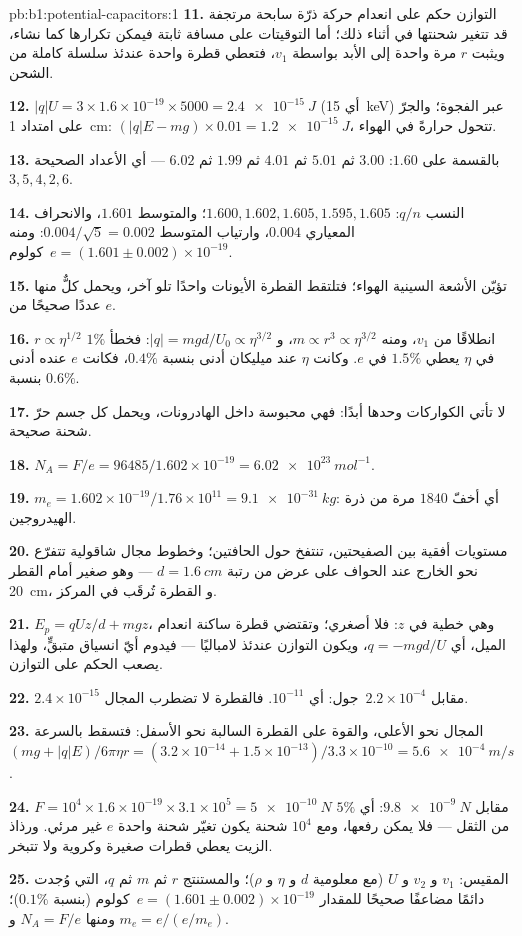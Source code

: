\begin{solution}{pb:b1:potential-capacitors:1}
\textbf{11.} التوازن حكم على انعدام حركة ذرّة سابحة مرتجفة
قد تتغير شحنتها في أثناء ذلك؛ أما التوقيتات على مسافة ثابتة فيمكن
تكرارها كما نشاء، ويثبت $r$ مرة واحدة إلى الأبد بواسطة $v_1$، فتعطي قطرة واحدة
عندئذ سلسلة كاملة من الشحن.

\textbf{12.} $|q|U = 3 \times 1.6 \times 10^{-19} \times 5000 = \qty{2.4e-15}{J}$
(أي \qty{15}{keV}) عبر الفجوة؛ والجرّ على امتداد \qty{1}{cm}: $(|q|E - mg) \times 0.01 =
\qty{1.2e-15}{J}$، تتحول حرارةً في الهواء.

\textbf{13.} بالقسمة على $1.60$: $3.00$ ثم $5.01$ ثم $4.01$ ثم $1.99$ ثم $6.02$ ---
أي الأعداد الصحيحة $3, 5, 4, 2, 6$.

\textbf{14.} النسب $q/n$: $1.600, 1.602, 1.605, 1.595, 1.605$؛ والمتوسط $1.601$،
والانحراف المعياري $0.004$، وارتياب المتوسط $0.004/\sqrt5 =
0.002$: ومنه $e = (1.601 \pm 0.002) \times 10^{-19}$~كولوم.

\textbf{15.} تؤيّن الأشعة السينية الهواء؛ فتلتقط القطرة الأيونات واحدًا
تلو آخر، ويحمل كلٌّ منها عددًا صحيحًا من $e$.

\textbf{16.} $r \propto \eta^{1/2}$ انطلاقًا من $v_1$، ومنه $m \propto r^3 \propto \eta^{3/2}$، و
$|q| = mgd/U_0 \propto \eta^{3/2}$: فخطأ $1\%$ في $\eta$ يعطي $1.5\%$ في $e$. وكانت
$\eta$ عند ميليكان أدنى بنسبة $0.4\%$، فكانت $e$ عنده أدنى بنسبة $0.6\%$.

\textbf{17.} لا تأتي الكواركات وحدها أبدًا: فهي محبوسة داخل الهادرونات،
ويحمل كل جسم حرّ شحنة صحيحة.

\textbf{18.} $N_A = F/e = 96485/1.602 \times 10^{-19} = \qty{6.02e23}{mol^{-1}}$.

\textbf{19.} $m_e = 1.602 \times 10^{-19}/1.76 \times 10^{11} = \qty{9.1e-31}{kg}$: أي أخفّ $1840$
مرة من ذرة الهيدروجين.

\textbf{20.} مستويات أفقية بين الصفيحتين، تنتفخ حول
الحافتين؛ وخطوط مجال شاقولية تتفرّع نحو الخارج عند الحواف على عرض
من رتبة $d = \qty{1.6}{cm}$ --- وهو صغير أمام القطر \qty{20}{cm}، و
القطرة تُرقَب في المركز.

\textbf{21.} $E_p = qUz/d + mgz$، وهي خطية في $z$: فلا أصغري؛ وتقتضي
قطرة ساكنة انعدام الميل، أي $q = -mgd/U$، ويكون التوازن
عندئذ لامباليًا --- فيدوم أيّ انسياق متبقٍّ، ولهذا يصعب الحكم على
التوازن.

\textbf{22.} $2.4 \times 10^{-15}$ مقابل $2.2 \times 10^{-4}$~جول: أي $10^{-11}$. فالقطرة
لا تضطرب المجال.

\textbf{23.} المجال نحو الأعلى، والقوة على القطرة السالبة نحو الأسفل: فتسقط بالسرعة $(mg
+ |q|E)/6\pi\eta r = (3.2 \times 10^{-14} + 1.5 \times 10^{-13})/3.3 \times 10^{-10} =
\qty{5.6e-4}{m/s}$.

\textbf{24.} $F = 10^4 \times 1.6 \times 10^{-19} \times 3.1 \times 10^5 = \qty{5e-10}{N}$
مقابل $\qty{9.8e-9}{N}$: أي $5\%$ من الثقل --- فلا يمكن رفعها، ومع
$10^4$ شحنة يكون تغيّر شحنة واحدة $e$ غير مرئي. ورذاذ الزيت يعطي قطرات
صغيرة وكروية ولا تتبخر.

\textbf{25.} المقيس: $v_1$ و $v_2$ و $U$ (مع معلومية $d$ و $\eta$ و $\rho$)؛
والمستنتج $r$ ثم $m$ ثم $q$، التي وُجدت دائمًا مضاعفًا صحيحًا للمقدار
$e = (1.601 \pm 0.002) \times 10^{-19}$~كولوم (بنسبة $0.1\%$)؛ ومنها $N_A = F/e$ و
$m_e = e/(e/m_e)$.
\end{solution}
